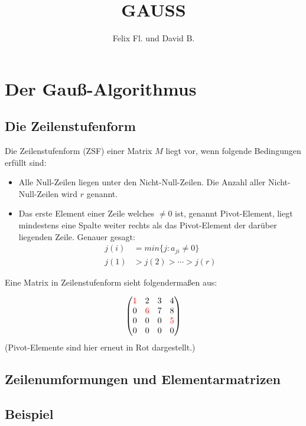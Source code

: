 \documentclass{scrartcl}
\title{GAUSS}
\author{Felix Fl. und David B.}
\begin{document}
\maketitle

\tableofcontents
\newpage

\section{Der Gauß-Algorithmus}


\subsection{Die Zeilenstufenform}
Die Zeilenstufenform (ZSF) einer Matrix $M$ liegt vor, wenn folgende Bedingungen erfüllt sind:
\begin{itemize}
\item Alle Null-Zeilen liegen unter den Nicht-Null-Zeilen. Die Anzahl aller Nicht-Null-Zeilen wird $r$ genannt.
\item Das erste Element einer Zeile welches $\neq 0$ ist, genannt Pivot-Element, liegt mindestens eine Spalte weiter rechts als das Pivot-Element der darüber liegenden Zeile. Genauer gesagt: 
\begin{align*}
	j(i) & = min\{j: a_{ji} \neq 0 \} \\
	j(1) & > j(2) > \cdots > j(r)
\end{align*} 
\end{itemize}

Eine Matrix in Zeilenstufenform sieht folgendermaßen aus:

\[ \begin{pmatrix}{\color{red}1}
& 2 & 3 & 4\\ 
0 &{\color{red}6}& 7 & 8  \\ 
0 & 0 & 0 &{\color{red}5} \\ 
0 &0& 0 & 0\\ 
\end{pmatrix} \]
(Pivot-Elemente sind hier erneut in Rot dargestellt.)

\subsection{Zeilenumformungen und Elementarmatrizen}


\subsection{Beispiel}

\end{document}
